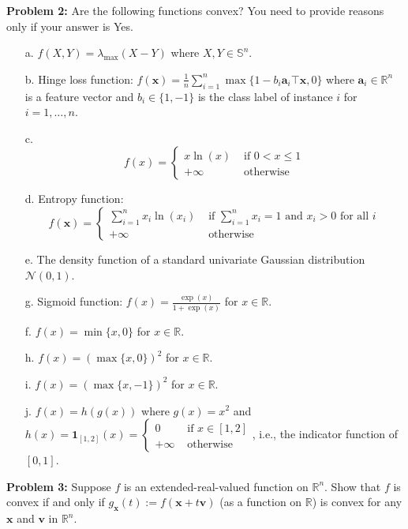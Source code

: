 \documentclass{article}
\newcommand{\bx}{{\mathbf x}}
\newcommand{\ba}{{\mathbf a}}
\newcommand{\bv}{{\mathbf v}}
\begin{document}
\noindent\textbf{Problem 2:} Are the following functions convex? You need to provide reasons only if your answer is Yes.
\begin{enumerate}
\item[a.] $f(X,Y)=\lambda_{\max}(X-Y)$ where $X,Y\in\mathbb{S}^n$.
\item[b.] Hinge loss function: $f(\bx)=\frac{1}{n}\sum_{i=1}^n\max\{1-b_i\ba_i\top \bx,0\}$ where $\ba_i\in\mathbb{R}^n$ is a feature vector and $b_i\in\{1,-1\}$ is the class label of instance $i$ for $i=1,\dots,n$.
\item[c.] 
$$
f(x)=\left\{\begin{array}{ll}
x\ln(x)&\text{ if }0< x\leq 1\\
+\infty&\text{ otherwise}
\end{array}
\right.
$$
\item[d.] Entropy function: 
$$
f(\bx)=
\left\{
\begin{array}{ll}
\sum_{i=1}^{n}x_i\ln(x_i)&\text{ if }\sum_{i=1}^nx_i=1\text{ and }x_i>0\text{ for all }i\\
+\infty&\text{ otherwise}
\end{array}
\right.
$$
\item[e.] The density function of a standard univariate Gaussian distribution $\mathcal{N}(0,1)$. 
\item[g.] Sigmoid function: $f(x)=\frac{\exp(x)}{1+\exp(x)}$ for $x\in\mathbb{R}$.
\item[f.] $f(x)=\min\{x,0\}$ for $x\in\mathbb{R}$.
\item[h.] $f(x)=(\max\{x,0\})^2$ for $x\in\mathbb{R}$.
\item[i.] $f(x)=(\max\{x,-1\})^2$ for $x\in\mathbb{R}$.
\item[j.] $f(x)=h(g(x))$ where $g(x)=x^2$ and $h(x)=\mathbf{1}_{[1,2]}(x)=\left\{\begin{array}{ll}0&\text{ if }x\in[1,2]\\+\infty&\text{ otherwise}\end{array}\right.$, i.e., the indicator function of $[0,1]$.
\end{enumerate}

\noindent\textbf{Problem 3:} Suppose $f$ is an extended-real-valued function on $\mathbb{R}^n$.
Show that $f$ is convex if and only if $g_{\bx}(t):=f(\bx+t\bv)$ (as a function on $\mathbb R$) is convex for any $\bx$ and $\bv$ in $\mathbb{R}^n$.
\end{document}
